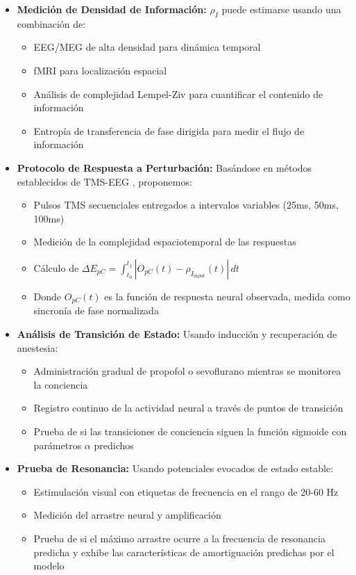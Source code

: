 \documentclass[12pt]{article}
\begin{document}
\begin{itemize}
    \item \textbf{Medición de Densidad de Información:} $\rho_I$ puede estimarse usando una combinación de:
    \begin{itemize}[label=--]
        \item EEG/MEG de alta densidad para dinámica temporal
        \item fMRI para localización espacial
        \item Análisis de complejidad Lempel-Ziv para cuantificar el contenido de información \cite{schartner2015,casali2013}
        \item Entropía de transferencia de fase dirigida para medir el flujo de información \cite{hillebrand2016}
    \end{itemize}
    
    \item \textbf{Protocolo de Respuesta a Perturbación:} Basándose en métodos establecidos de TMS-EEG \cite{casarotto2016}, proponemos:
    \begin{itemize}[label=--]
        \item Pulsos TMS secuenciales entregados a intervalos variables (25ms, 50ms, 100ms)
        \item Medición de la complejidad espaciotemporal de las respuestas
        \item Cálculo de $\Delta E_{pC} = \int_{t_0}^{t_1} |O_{pC}(t) - \rho_{I_{\text{input}}}(t)| \, dt$
        \item Donde $O_{pC}(t)$ es la función de respuesta neural observada, medida como sincronía de fase normalizada
    \end{itemize}
    
    \item \textbf{Análisis de Transición de Estado:} Usando inducción y recuperación de anestesia:
    \begin{itemize}[label=--]
        \item Administración gradual de propofol o sevoflurano mientras se monitorea la conciencia
        \item Registro continuo de la actividad neural a través de puntos de transición
        \item Prueba de si las transiciones de conciencia siguen la función sigmoide con parámetros $\alpha$ predichos
    \end{itemize}
    
    \item \textbf{Prueba de Resonancia:} Usando potenciales evocados de estado estable:
    \begin{itemize}[label=--]
        \item Estimulación visual con etiquetas de frecuencia en el rango de 20-60 Hz
        \item Medición del arrastre neural y amplificación
        \item Prueba de si el máximo arrastre ocurre a la frecuencia de resonancia predicha y exhibe las características de amortiguación predichas por el modelo
    \end{itemize}
\end{itemize}
\end{document}
